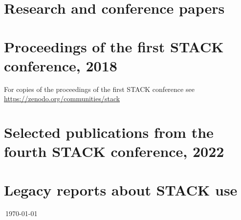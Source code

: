 \documentclass[11pt]{article}
\begin{document}
\section{Research and conference papers}
\nocite{Gratwick2020,Akveld2024,2018Mastery,Yoshitomi2018,Barbas2016,Nakamura2016,Sangwin2015KHDM}
\nocite{Rasila2016,Rasila2016b,Rasila2016c}
\nocite{Shirai2015a,Shirai2015b,Pavia2015,Nakamura2014,Shirai2014,Nakamura2013}
\nocite{Sangwin2012ICME,Sangwin2013HEA,Lowe2010,Sangwin2009Equality,Sangwin2010IGI,Nakamura2010b}
\nocite{Rasila2010,Sangwin2009Calculumus,Sangwin2009ICMI,Rasila2007}
\nocite{Sangwin2006CASAlgebra,WebALT2006,Sangwin2006UniServe,SangwinTMA03,SangwinHSkills02}
\nocite{lowe_mestel_2019,erskine_mestel_2018,Paiva2017}
\nocite{Kinnear2022,Kinnear2022,Kontorovich2023,Kinnear2023CERME,Kinnear2024RME,Akveld2024,KinnearIannone2024PME}
\nocite{Kinnear2024FAME,Razeghpour2024FAME,Taha2024FAME}
\printbibliography[heading=none]

\section{Proceedings of the first STACK conference, 2018}
For copies of the proceedings of the first STACK conference see \url{https://zenodo.org/communities/stack}

\nocite{harterich_jorg_2019_2582874,mai_tobias_2019_2582427,klischat_cosima_2019_2577116,kinnear_george_2019_2565969,zerva_konstantina_2019_2585816}
\nocite{bird_anja_2019_2563076,fath_julia_2019_2565860,altieri_mike_2019_2564881,bach_stephan_2019_2563803,miriam_weigel_2019_2563656,eckhoff_malte_2019_2561190}
\printbibliography[heading=none]

\section{Selected publications from the fourth STACK conference, 2022}
\nocite{2023-iJET-STACK-exams,2023-iJET-STACK-GeoGebra,2022-SeparatedConcerns,2022-HELM-Konstantina,HooperJones2023}
\printbibliography[heading=none]

\section{Legacy reports about STACK use}
\nocite{2010STACKReport,2013STACK-Brum,2015STACKReport,2019STACKReport,2022-STACK-Edinburgh}
\printbibliography[heading=none]


$~$\hfill{\tiny \today}
\end{document}
